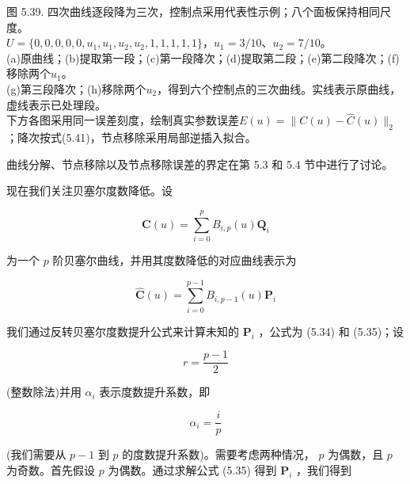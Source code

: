 \documentclass[../main.tex]{subfiles}
\begin{document}
\begin{center}
\begin{minipage}{27.2cm}
\vspace*{.6\baselineskip}
\centering
{}
\par\medskip
{}
\par\medskip
{}
\par\medskip
{}
\par\smallskip
图 5.39. 四次曲线逐段降为三次，控制点采用代表性示例；八个面板保持相同尺度。\\
$U=\{0,0,0,0,0,u_1,u_1,u_2,u_2,1,1,1,1,1\}$，$u_1=3/10$、$u_2=7/10$。\\
(a)原曲线；(b)提取第一段；(c)第一段降次；(d)提取第二段；(e)第二段降次；(f)移除两个$u_1$。\\
(g)第三段降次；(h)移除两个$u_2$，得到六个控制点的三次曲线。实线表示原曲线，虚线表示已处理段。\\
下方各图采用同一误差刻度，绘制真实参数误差$E(u)=\|C(u)-\widehat C(u)\|_2$；降次按式(5.41)，节点移除采用局部逆插入拟合。
\end{minipage}
\end{center}

曲线分解、节点移除以及节点移除误差的界定在第 5.3 和 5.4 节中进行了讨论。



现在我们关注贝塞尔度数降低。设

\[
\mathbf{C}\left( u\right)  = \mathop{\sum }\limits_{{i = 0}}^{p}{B}_{i,p}\left( u\right) {\mathbf{Q}}_{i}
\]

为一个 \(p\) 阶贝塞尔曲线，并用其度数降低的对应曲线表示为

\[
\widehat{\mathbf{C}}\left( u\right)  = \mathop{\sum }\limits_{{i = 0}}^{{p - 1}}{B}_{i,p - 1}\left( u\right) {\mathbf{P}}_{i}
\]

我们通过反转贝塞尔度数提升公式来计算未知的 \({\mathbf{P}}_{i}\) ，公式为 (5.34) 和 (5.35)；设

\[
r = \frac{p - 1}{2} \tag{5.40}
\]

(整数除法)并用 \({\alpha }_{i}\) 表示度数提升系数，即

\[
{\alpha }_{i} = \frac{i}{p}
\]

(我们需要从 \(p - 1\) 到 \(p\) 的度数提升系数)。需要考虑两种情况， \(p\) 为偶数，且 \(p\) 为奇数。首先假设 \(p\) 为偶数。通过求解公式 (5.35) 得到 \({\mathbf{P}}_{i}\) ，我们得到
\end{document}
